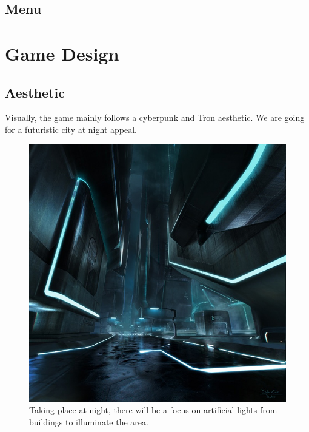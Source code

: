 \documentclass{article}
\theoremstyle{definition}
\begin{document}
\subsection{Menu}

\section{Game Design}

\subsection{Aesthetic}

Visually, the game mainly follows a cyberpunk and Tron aesthetic. We are going
for a futuristic city at night appeal.

\begin{figure}[htpb]
  \centering
  \includegraphics[width=0.8\linewidth]{images/theme01.jpg}
  \caption{Taking place at night, there will be a focus on artificial lights
  from buildings to illuminate the area.}
\label{fig:theme01}
\end{figure}
\end{document}
